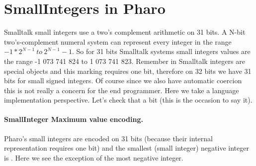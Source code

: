 \documentclass[a4paper,10pt,twoside]{book}
\begin{document}
%	
% 



%
%
%	





\section{SmallIntegers in Pharo}

Smalltalk small integers use a two's complement arithmetic on 31 bits.  A N-bit two's-complement numeral system can represent every integer in the range $-1 * 2^{N-1}\ to\ 2^{N-1}-1$. So for 31 bits Smalltalk systems small integers values are the range -1 073 741 824 to  1 073 741 823.  Remember in Smalltalk integers are special objects and this marking requires one bit, therefore on 32 bits we have 31 bits for small signed integers. Of course since we also have automatic coercion this is not really a concern for the end programmer. Here we take a language implementation perspective.
 Let's check that a bit (this is the occasion to say it). 



\paragraph{SmallInteger Maximum value encoding.}		
Pharo's small integers are encoded on 31 bits (because their internal representation requires one bit) and the smallest (small integer) negative integer is . Here we see the exception of the most negative integer. 
\end{document}
